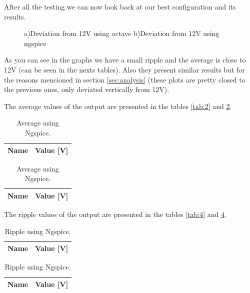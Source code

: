 After all the testing we can now look back at our best configuration and its results. 
\vspace{-2cm}
\begin{figure}[h!]
            \centering
            \caption{a)Deviation from 12V using octave b)Deviation from 12V using ngspice}
            \label{fig:4}
\end{figure}

As you can see in the graphs we have a small ripple and the average is close to 12V (can be seen in the nexts tables).
Also they present similar results but for the reasons mencioned in section \ref{sec:analysis} (these plots are pretty closed to the previous ones, only deviated vertically from 12V).

The average values of the output are presented in the tables \ref{tab:2} and \ref{tab:3}. 

\begin{table}[!htb]
	\begin{minipage}{.5\linewidth}
	\centering
	\begin{tabular}{ll}
	{\bf Name} & {\bf Value [V]} \\ \hline
	
	\end{tabular}
	\caption{Average using Octave.}
	\label{tab:2}
  	\end{minipage}
  	\hfill
	\begin{minipage}{.5\linewidth}
	\centering
  	\begin{tabular}{ll}
   	{\bf Name} & {\bf Value [V]} \\ \hline
   	
	\end{tabular}
	\caption{Average using Ngspice.}
	\label{tab:3}
	\end{minipage}
\end{table}

The ripple values of the output are presented in the tables \ref{tab:4} and \ref{tab:5}.

\begin{table}[!htb]
	\begin{minipage}{.5\linewidth}
	\centering
	\begin{tabular}{ll}
	{\bf Name} & {\bf Value [V]} \\ \hline
	
	\end{tabular}
	\caption{Ripple using Octave.}
	\label{tab:4}
  	\end{minipage}
  	\hfill
	\begin{minipage}{.5\linewidth}
	\centering
  	\begin{tabular}{ll}
   	{\bf Name} & {\bf Value [V]} \\ \hline
   	
	\end{tabular}
	\caption{Ripple using Ngspice.}
	\label{tab:5}
	\end{minipage}
\end{table}


